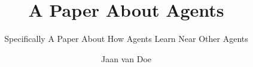 \documentclass[a4paper, twoside,%
11pt]{malrep}
\begin{document}

\title{A Paper About Agents}
\subtitle{Specifically A Paper About How Agents Learn Near Other Agents}
\author{Jaan van Doe}

\maketitle

\begin{article}
  
\end{article}
\end{document}
